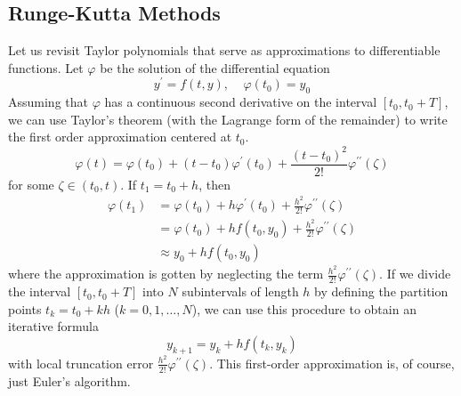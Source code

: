 \documentclass{article}
\theoremstyle{remark}
\theoremstyle{definition}
\begin{document}
\subsection{Runge-Kutta Methods}
Let us revisit Taylor polynomials that serve as approximations to differentiable functions. Let $\varphi$ be the solution of the differential equation 
\[y^\prime = f(t, y) , \;\;\;\; \varphi(t_0) = y_0\]
Assuming that $\varphi$ has a continuous second derivative on the interval $[t_0, t_0 + T]$, we can use Taylor's theorem (with the Lagrange form of the remainder) to write the first order approximation centered at $t_0$.  
\[\varphi(t) = \varphi(t_0) + (t - t_0) \varphi^\prime (t_0) + \frac{(t - t_0)^2}{2!} \varphi^{\prime\prime} (\zeta)\]
for some $\zeta \in (t_0, t)$. If $t_1 = t_0 + h$, then
\begin{align*}
    \varphi(t_1) & = \varphi(t_0) + h \varphi^\prime (t_0) + \frac{h^2}{2!} \varphi^{\prime\prime} (\zeta) \\
    & = \varphi(t_0) + h f(t_0, y_0) + \frac{h^2}{2!} \varphi^{\prime\prime} (\zeta) \\
    & \approx y_0 + h f(t_0, y_0)
\end{align*}
where the approximation is gotten by neglecting the term $\frac{h^2}{2!} \varphi^{\prime\prime} (\zeta)$. If we divide the interval $[t_0, t_0 + T]$ into $N$ subintervals of length $h$ by defining the partition points $t_k = t_0 + kh$ ($k = 0, 1, \ldots, N$), we can use this procedure to obtain an iterative formula
\[y_{k+1} = y_k + hf(t_k, y_k)\]
with local truncation error $\frac{h^2}{2!} \varphi^{\prime\prime} (\zeta)$. This first-order approximation is, of course, just Euler's algorithm. 
\end{document}
